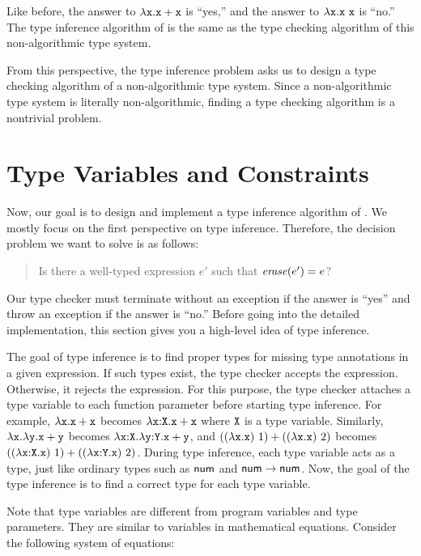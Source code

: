 Like before, the answer to $\lambda\texttt{x}.\texttt{x}+\texttt{x}$ is ``yes,'' and the
answer to $\lambda\texttt{x}.\texttt{x}\ \texttt{x}$ is ``no.'' The type inference algorithm
of \Lang is the same as the type checking algorithm of this non-algorithmic type
system.

From this perspective, the type inference problem asks us to design a type
checking algorithm of a non-algorithmic type system. Since a non-algorithmic
type system is literally non-algorithmic, finding a type checking algorithm is
a nontrivial problem.

\section{Type Variables and Constraints}

Now, our goal is to design and implement a type inference algorithm of
\Lang. We mostly focus on the first perspective on type inference. Therefore,
the decision problem we want to solve is as follows:

\begin{quote}
  \hspace{-1em}Is there a well-typed \plang expression $e'$ such that $\mbox{\emph{erase}}(e')=e$?
\end{quote}

Our type checker must terminate without an exception if the answer is ``yes''
and throw an exception if the answer is ``no.'' Before going into the detailed
implementation, this section gives you a high-level idea of type inference.

The goal of type inference is to find proper types for missing type annotations
in a given expression. If such types exist, the type checker accepts the
expression. Otherwise, it rejects the expression.  For this purpose, the type
checker attaches a type variable to each function parameter before starting type
inference. For example, $\lambda\texttt{x}.\texttt{x}+\texttt{x}$ becomes
$\lambda\texttt{x}{:}\texttt{X}.\texttt{x}+\texttt{x}$ where $\texttt{X}$ is a type variable. Similarly,
$\lambda\texttt{x}.\lambda\texttt{y}.\texttt{x}+\texttt{y}$ becomes
$\lambda\texttt{x}{:}\texttt{X}.\lambda\texttt{y}{:}\texttt{Y}.\texttt{x}+\texttt{y}$, and
$((\lambda\texttt{x}.\texttt{x})\ 1)+((\lambda\texttt{x}.\texttt{x})\ 2)$ becomes
$((\lambda\texttt{x}{:}\texttt{X}.\texttt{x})\ 1)+((\lambda\texttt{x}{:}\texttt{Y}.\texttt{x})\ 2)$.
During type inference, each type variable acts as a type, just like
ordinary types such as $\textsf{num}$ and $\textsf{num}\rightarrow\textsf{num}$. Now, the goal of the
type inference is to find a correct type for each type variable.

Note that type variables are different from program variables and type
parameters. They are similar to variables in mathematical equations. Consider
the following system of equations:


